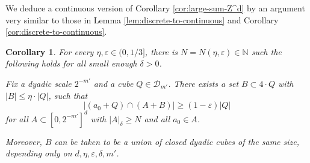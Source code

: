 \documentclass[12pt]{amsart}
\newcommand{\e}{\varepsilon}
\newtheorem{corollary}[theorem]{Corollary}
\def\N{{\mathbb{N}}}
\newcommand{\cD}{\mathcal{D}}
\numberwithin{theorem}{section}
\numberwithin{equation}{section}
\begin{document}
We deduce a continuous version of Corollary \ref{cor:large-sum-Z^d} by an argument very similar to those in Lemma \ref{lem:discrete-to-continuous} and Corollary \ref{cor:discrete-to-continuous}.
\begin{corollary} \label{cor:large-sum-R^d}
    For every $\eta,\e\in (0,1/3]$, there is $N=N(\eta,\e)\in\N$ such the following holds for all small enough $\delta>0$.

    Fix a dyadic scale $2^{-m'}$ and a cube $Q\in\cD_{m'}$. There exists a set $B\subset 4\cdot Q$ with $|B|\le \eta\cdot |Q|$, such that
    \[
        \bigl|(a_0+Q)\cap (A+B)\bigr| \ge (1-\e)|Q|
    \]
    for all  $A\subset [0,2^{-m'}]^d$ with  $|A|_{\delta}\ge N$ and all $a_0\in A$.


    Moreover, $B$ can be taken to be a union of closed dyadic cubes of the same size, depending only on $d,\eta,\e,\delta,m'$.
\end{corollary}
\end{document}
